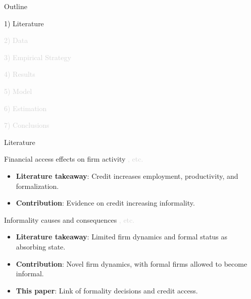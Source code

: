 \documentclass[aspectratio=169]{beamer}
\begin{document}
\begin{frame}[noframenumbering]{Outline}

\Large

1) Literature

\vspace{4mm}

\textcolor{lightgray}{2) Data}

\vspace{4mm}

\textcolor{lightgray}{3) Empirical Strategy}

\vspace{4mm}

\textcolor{lightgray}{4) Results}

\vspace{4mm}

\textcolor{lightgray}{5) Model}

\vspace{4mm}

\textcolor{lightgray}{6) Estimation}

\vspace{4mm}

\textcolor{lightgray}{7) Conclusions}


\end{frame}


\begin{frame}{Literature}\label{literature}

Financial access effects on firm activity \textcolor{lightgray}{\citep{amiti2018much,greenstone2020credit,gutierrez2023credit,khwaja2008tracing,chodorow2014employment}, etc.}
 \begin{itemize}
    \item \textbf{Literature takeaway}: Credit increases employment, productivity, and formalization.
    \item \textbf{Contribution}: Evidence on credit increasing informality.
 \end{itemize}

\vspace{10mm}
\pause

Informality causes and consequences \textcolor{lightgray}{\citep{ulyssea2018firms,meghir2015wages,la2014informality,almeida2012enforcement,busso2012formal,adom2025structural}, etc.}
\begin{itemize}
    \item \textbf{Literature takeaway}: Limited firm dynamics and formal status as absorbing state.
     \item \textbf{Contribution}: Novel firm dynamics, with formal firms allowed to become informal.
 \end{itemize}

\vspace{10mm}
\pause

\begin{itemize}
    \item[$\Rightarrow$] \Large \textbf{This paper}: Link of formality decisions and credit access. 
\end{itemize}

\end{frame}
\end{document}
